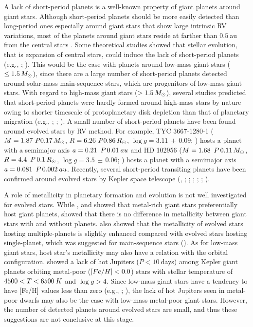 \documentclass[]{pasj01}
\begin{document}
A lack of short-period planets is a well-known property of giant planets around giant stars.
Although short-period planets should be more easily detected than long-period ones especially around giant stars that show large intrinsic RV variations, most of the planets around giant stars reside at farther than $0.5\>$au from the central stars \citep{Jones2014}.
Some theoretical studies showed that stellar evolution, that is expansion of central stars, could induce the lack of short-period planets (e.g., \cite{Villaver2009}; \cite{Kunitomo2011}).
This would be the case with planets around low-mass giant stars ($\leq1.5\,M_{\Sol}$), since there are a large number of short-period planets detected around solar-mass main-sequence stars, which are progenitors of low-mass giant stars.
With regard to high-mass giant stars ($>1.5\,M_{\Sol}$), several studies predicted that short-period planets were hardly formed around high-mass stars by nature owing to shorter timescale of protoplanetary disk depletion than that of planetary migration (e.g., \cite{Burkert2007}; \cite{Kennedy2009}; \cite{Currie2009}).
A small number of short-period planets have been found around evolved stars by RV method.
For example, TYC 3667-1280-1 ($M=1.87\pm0.17\,M_{\Sol}$, $R=6.26\pm0.86\,R_{\Sol}$, $\log g=3.11\,\pm\,0.09$; \cite{Niedzielski2016}) hosts a planet with a semimajor axis $a=0.21\,\pm\,0.01\>{\rm au}$ and HD 102956 ($M=1.68\,\pm\,0.11\,M_{\Sol}$, $R=4.4\,\pm\,0.1\,R_{\Sol}$, $\log g=3.5\,\pm\,0.06$; \cite{Johnson2010}) hosts a planet with a semimajor axis $a=0.081\,\pm\,0.002\>{\rm au}$.
Recently, several short-period transiting planets have been confirmed around evolved stars by Kepler space telescope (\cite{Lillo-Box2014a}, ; \cite{Barclay2015}; \cite{Sato2015}; \cite{VanEylen2016}; \cite{Grunblatt2016}; \cite{Jones2017arXiv}).

A role of metallicity in planetary formation and evolution is not well investigated for evolved stars.
While \citet{Reffert2015}, \citet{Jones2016} and \citet{Wittenmyer2017} showed that metal-rich giant stars preferentially host giant planets, \citet{Jofre2015} showed that there is no difference in metallicity between giant stars with and without planets.
\citet{Jofre2015} also showed that the metallicity of evolved stars hosting multiple-planets is slightly enhanced compared with evolved stars hosting single-planet, which was suggested for main-sequence stars (\cite{Wright2009}).
As for low-mass giant stars, host star's metallicity may also have a relation with the orbital configuration.
\citet{Dawson2013} showed a lack of hot Jupiters ($P<10\>$days) among Kepler giant planets orbiting metal-poor (${\rm [Fe/H]}<0.0$) stars with stellar temperature of $4500<T<6500\>{\rm K}$ and $\log g>4$.
Since low-mass giant stars have a tendency to have [Fe/H] values less than zero (e.g., \cite{Maldonado2013}; \cite{Jofre2015}), the lack of hot Jupiters seen in metal-poor dwarfs may also be the case with low-mass metal-poor giant stars.
However, the number of detected planets around evolved stars are small, and thus these suggestions are not conclusive at this stage.
\end{document}

